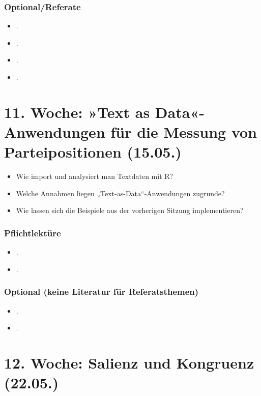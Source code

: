 \documentclass[abstract=on,parskip=full,headings=standardclasses,fontsize=11pt,paper=a4]{scrartcl}
\begin{document}
\subsubsection*{Optional/Referate}
\begin{itemize}
\item {}.
\item {}.
\item {}.
\item {}.
\end{itemize}


\section{11. Woche:  »Text as Data«-Anwendungen für die Messung von Parteipositionen (15.05.)}



\begin{itemize}
\renewcommand\labelitemi{--}
\item Wie import und analysiert man Textdaten mit \textsf{R}?
\item Welche Annahmen liegen „Text-as-Data“-Anwendungen zugrunde?
\item Wie lassen sich die Beispiele aus der vorherigen Sitzung implementieren?
\end{itemize}

\subsubsection*{Pflichtlektüre}
\begin{itemize}
\item {}.
\item {}.
\end{itemize}


\subsubsection*{Optional (keine Literatur für Referatsthemen)}
\begin{itemize}
\item {}.
\item {}.
\end{itemize}


\section{12. Woche: Salienz und Kongruenz (22.05.)}
\end{document}
